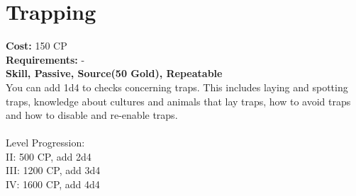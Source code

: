\section{Trapping}
\textbf{Cost:} 150 CP\\
\textbf{Requirements:} -\\
\textbf{Skill, Passive, Source(50 Gold), Repeatable}\\
You can add 1d4 to checks concerning traps. This includes laying and spotting traps, knowledge about cultures and animals that lay traps, how to avoid traps and how to disable and re-enable traps.\\
\\
Level Progression:\\
II: 500 CP, add 2d4\\
III: 1200 CP, add 3d4\\
IV: 1600 CP, add 4d4\\